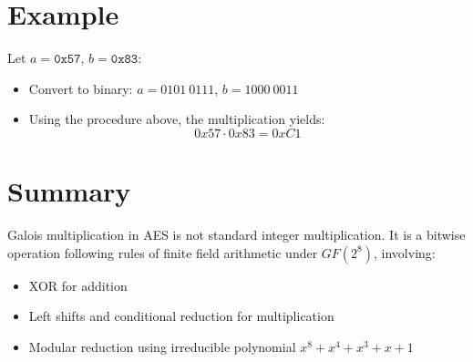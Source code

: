 \documentclass[12pt,a4paper]{report}
\begin{document}
\section*{Example}

Let \( a = \texttt{0x57} \), \( b = \texttt{0x83} \):

\begin{itemize}
    \item Convert to binary: \( a = 0101~0111 \), \( b = 1000~0011 \)
    \item Using the procedure above, the multiplication yields: 
    \[
    0x57 \cdot 0x83 = 0xC1
    \]
\end{itemize}

\section*{Summary}

Galois multiplication in AES is not standard integer multiplication. It is a bitwise operation following rules of finite field arithmetic under \( GF(2^8) \), involving:

\begin{itemize}
    \item XOR for addition
    \item Left shifts and conditional reduction for multiplication
    \item Modular reduction using irreducible polynomial \( x^8 + x^4 + x^3 + x + 1 \)
\end{itemize}
\end{document}
